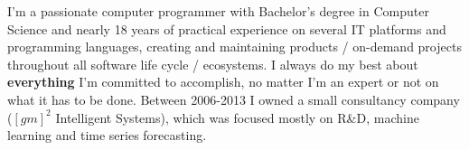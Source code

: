 
\begin{cvparagraph}
I’m a passionate computer programmer with Bachelor’s degree in Computer Science and nearly 18 years 
of practical experience on several IT platforms and programming languages, creating and maintaining 
products / on-demand projects throughout all software life cycle / ecosystems. 
I always do my best about \textbf{everything} I’m committed to accomplish, no matter I’m an expert 
or not on what it has to be done. Between 2006-2013 I owned a small consultancy company 
($[gm]^2$ Intelligent Systems), which was focused mostly on R\&D, machine learning and time series forecasting.
\end{cvparagraph}
